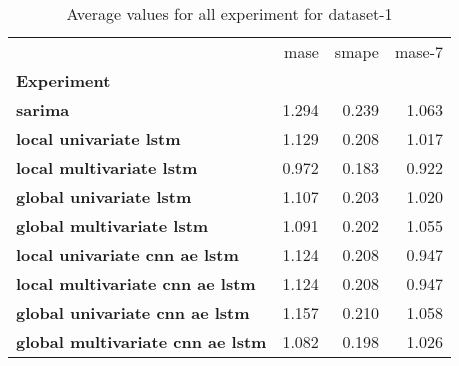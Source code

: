 \begin{table}[h]
\centering
\caption{Average values for all experiment for dataset-1}
\label{table:Average-metric-dataset-1}
\begin{tabular}{lrrr}
\toprule
{} &   mase &  smape &  mase-7 \\
\textbf{Experiment                     } &        &        &         \\
\midrule
\textbf{sarima                         } &  1.294 &  0.239 &   1.063 \\
\textbf{local univariate lstm          } &  1.129 &  0.208 &   1.017 \\
\textbf{local multivariate lstm        } &  0.972 &  0.183 &   0.922 \\
\textbf{global univariate lstm         } &  1.107 &  0.203 &   1.020 \\
\textbf{global multivariate lstm       } &  1.091 &  0.202 &   1.055 \\
\textbf{local univariate cnn ae lstm   } &  1.124 &  0.208 &   0.947 \\
\textbf{local multivariate cnn ae lstm } &  1.124 &  0.208 &   0.947 \\
\textbf{global univariate cnn ae lstm  } &  1.157 &  0.210 &   1.058 \\
\textbf{global multivariate cnn ae lstm} &  1.082 &  0.198 &   1.026 \\
\bottomrule
\end{tabular}
\end{table}
